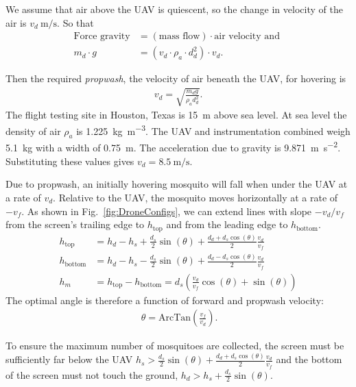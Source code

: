 We assume that air above the UAV is quiescent, so the change in velocity of the air is $v_d~ \si{\metre\per\second}$. So that 
\begin{align} \label{eq:forceBalanceForDrone}
\text{Force gravity} & = \left(\text{mass flow}\right) \cdot \text{air velocity and } \nonumber \\
m_{d} \cdot  g &= (v_d \cdot  \rho_a \cdot  d_d^2 ) \cdot  v_d. 
\end{align}

Then the required \emph{propwash}, the velocity of air beneath the UAV, for hovering is
\begin{align} \label{eq:dronePropwash}
v_d = \sqrt{ \frac{ m_d g}{\rho_a d_d^2} }.
\end{align}
The flight testing site in Houston, Texas is \SI{15}{\metre} above sea level. At sea level the density of air $\rho_a$ is \SI{1.225}{\kilogram\per\cubic\metre}.
The UAV and instrumentation combined weigh \SI{5.1}{\kilogram} with a width of \SI{0.75}{\metre}. The acceleration due to gravity is \SI{9.871}{\metre\per\square\second}.  Substituting these values gives $v_d = \SI{8.5}{\metre\per\second}$.

Due to propwash, an initially hovering mosquito will fall when under the UAV at a rate of $v_d$.  Relative to the UAV, the mosquito moves horizontally at a rate of $-v_f$.  As shown in Fig.~\ref{fig:DroneConfigs}, we can extend lines with slope $-v_d/v_f$ from the screen's trailing edge to $h_{\textrm{top}}$ and from the leading edge to $h_{\textrm{bottom}}$.
\begin{align} \label{eq:ClearedCrossSection}
h_{\textrm{top}} &= h_d - h_s + \frac{d_s}{2} \sin(\theta) +  \frac{d_d + d_s\cos(\theta)}{2}  \frac{v_d}{v_f} \nonumber \\
h_{\textrm{bottom}} &= h_d - h_s - \frac{d_s}{2} \sin(\theta) +  \frac{d_d - d_s\cos(\theta)}{2}  \frac{v_d}{v_f}  \nonumber \\
h_m &= h_{\textrm{top}} - h_{\textrm{bottom}} =  d_s\left(\frac{v_d}{v_f}\cos(\theta) + \sin(\theta) \right)
\end{align}
The optimal angle is therefore a function of forward and propwash velocity:
\begin{align} \label{eq:OptimalScreenAngle}
\ \theta = \mathrm{ArcTan}\left(\frac{v_f}{v_d}\right).
\end{align}

To ensure the maximum number of mosquitoes are collected, the screen must be sufficiently far below the UAV $ h_s > \frac{d_s}{2} \sin(\theta) +  \frac{d_d + d_s\cos(\theta)}{2}  \frac{v_d}{v_f}$  and the bottom of the screen must not touch the ground, $ h_d > h_s + \frac{d_s}{2} \sin(\theta) $.

